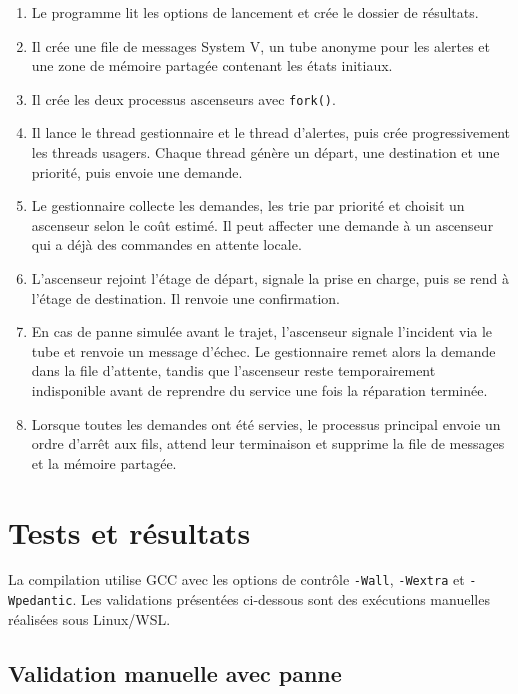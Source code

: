 \documentclass[11pt,a4paper]{article}
\begin{document}
\begin{enumerate}
  \item Le programme lit les options de lancement et crée le dossier de résultats.
  \item Il crée une file de messages System V, un tube anonyme pour les alertes et une zone de mémoire partagée contenant les états initiaux.
  \item Il crée les deux processus ascenseurs avec \texttt{fork()}.
  \item Il lance le thread gestionnaire et le thread d'alertes, puis crée progressivement les threads usagers. Chaque thread génère un départ, une destination et une priorité, puis envoie une demande.
  \item Le gestionnaire collecte les demandes, les trie par priorité et choisit un ascenseur selon le coût estimé. Il peut affecter une demande à un ascenseur qui a déjà des commandes en attente locale.
  \item L'ascenseur rejoint l'étage de départ, signale la prise en charge, puis se rend à l'étage de destination. Il renvoie une confirmation.
  \item En cas de panne simulée avant le trajet, l'ascenseur signale l'incident via le tube et renvoie un message d'échec. Le gestionnaire remet alors la demande dans la file d'attente, tandis que l'ascenseur reste temporairement indisponible avant de reprendre du service une fois la réparation terminée.
  \item Lorsque toutes les demandes ont été servies, le processus principal envoie un ordre d'arrêt aux fils, attend leur terminaison et supprime la file de messages et la mémoire partagée.
\end{enumerate}

\section{Tests et résultats}

La compilation utilise GCC avec les options de contrôle \texttt{-Wall}, \texttt{-Wextra} et \texttt{-Wpedantic}. Les validations présentées ci-dessous sont des exécutions manuelles réalisées sous Linux/WSL.\par

\subsection{Validation manuelle avec panne}
\end{document}
